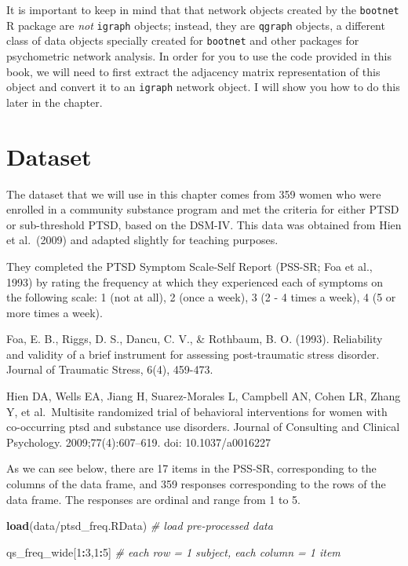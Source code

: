 \documentclass[
]{book}
\newenvironment{Shaded}{\begin{snugshade}}{\end{snugshade}}
\newcommand{\CommentTok}[1]{\textcolor[rgb]{0.56,0.35,0.01}{\textit{#1}}}
\newcommand{\DecValTok}[1]{\textcolor[rgb]{0.00,0.00,0.81}{#1}}
\newcommand{\FunctionTok}[1]{\textcolor[rgb]{0.13,0.29,0.53}{\textbf{#1}}}
\newcommand{\NormalTok}[1]{#1}
\newcommand{\SpecialCharTok}[1]{\textcolor[rgb]{0.81,0.36,0.00}{\textbf{#1}}}
\newcommand{\StringTok}[1]{\textcolor[rgb]{0.31,0.60,0.02}{#1}}
\begin{document}
It is important to keep in mind that that network objects created by the \texttt{bootnet} R package are \emph{not} \texttt{igraph} objects; instead, they are \texttt{qgraph} objects, a different class of data objects specially created for \texttt{bootnet} and other packages for psychometric network analysis. In order for you to use the code provided in this book, we will need to first extract the adjacency matrix representation of this object and convert it to an \texttt{igraph} network object. I will show you how to do this later in the chapter.

\section{Dataset}\label{dataset}

The dataset that we will use in this chapter comes from 359 women who were enrolled in a community substance program and met the criteria for either PTSD or sub-threshold PTSD, based on the DSM-IV. This data was obtained from Hien et al.~(2009) and adapted slightly for teaching purposes.

They completed the PTSD Symptom Scale-Self Report (PSS-SR; Foa et al., 1993) by rating the frequency at which they experienced each of symptoms on the following scale: 1 (not at all), 2 (once a week), 3 (2 - 4 times a week), 4 (5 or more times a week).

Foa, E. B., Riggs, D. S., Dancu, C. V., \& Rothbaum, B. O. (1993). Reliability and validity of a brief instrument for assessing post‐traumatic stress disorder. Journal of Traumatic Stress, 6(4), 459-473.

Hien DA, Wells EA, Jiang H, Suarez-Morales L, Campbell AN, Cohen LR, Zhang Y, et al.~Multisite randomized trial of behavioral interventions for women with co-occurring ptsd and substance use disorders. Journal of Consulting and Clinical Psychology. 2009;77(4):607--619. doi: 10.1037/a0016227

As we can see below, there are 17 items in the PSS-SR, corresponding to the columns of the data frame, and 359 responses corresponding to the rows of the data frame. The responses are ordinal and range from 1 to 5.

\begin{Shaded}
\begin{Highlighting}[]
\FunctionTok{load}\NormalTok{(}\StringTok{\textquotesingle{}data/ptsd\_freq.RData\textquotesingle{}}\NormalTok{) }\CommentTok{\# load pre{-}processed data }

\NormalTok{qs\_freq\_wide[}\DecValTok{1}\SpecialCharTok{:}\DecValTok{3}\NormalTok{,}\DecValTok{1}\SpecialCharTok{:}\DecValTok{5}\NormalTok{] }\CommentTok{\# each row = 1 subject, each column = 1 item }
\end{Highlighting}
\end{Shaded}
\end{document}
